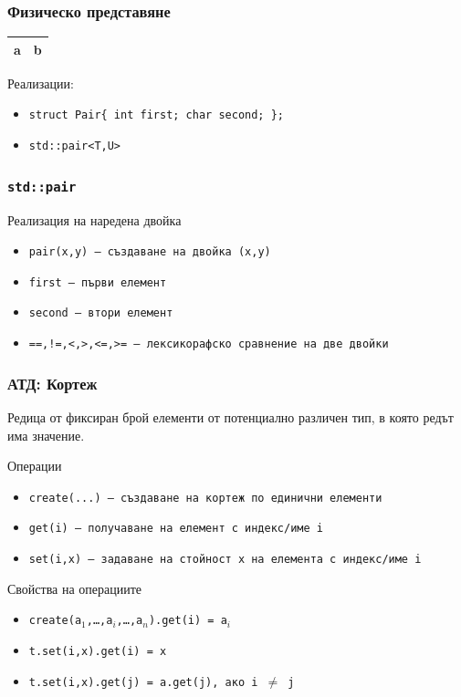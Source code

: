 \documentclass{beamer}
\begin{document}
\begin{frame}[fragile]
  \frametitle{Физическо представяне}

  \begin{center}
    \begin{tabular}{|m{5ex}|m{8ex}|}
      \hline
      \rowcolor{blue!60!green!40}
      a&b\\
      \hline
    \end{tabular}
  \end{center}
  \vspace{2em}

  Реализации:
  \begin{itemize}
  \item \verb#struct Pair{ int first; char second; };#
  \item \verb#std::pair<T,U>#
  \end{itemize}
\end{frame}

\begin{frame}
  \frametitle{\tt{std::pair}}

  Реализация на наредена двойка
  \begin{itemize}
  \item \tt{pair(x,y)} --- създаване на двойка (\tt x,\tt y)
  \item \tt{first} --- първи елемент
  \item \tt{second} --- втори елемент
  \item \tt{==,!=,<,>,<=,>=} --- лексикорафско сравнение на две двойки
  \end{itemize}
\end{frame}

\begin{frame}
  \frametitle{АТД: Кортеж}

  Редица от фиксиран брой елементи от потенциално различен тип, в която редът има значение.
  \vspace{0.5em}

  Операции
  \vspace{0.5em}

  \begin{itemize}
  \item \tt{create(...)} --- създаване на кортеж по единични елементи
  \item \tt{get(i)} --- получаване на елемент с индекс/име \tt i
  \item \tt{set(i,x)} --- задаване на стойност \tt x на елемента с индекс/име \tt i
  \end{itemize}

  Свойства на операциите
  \vspace{0.5em}

  \begin{itemize}
  \item \tt{create(a$_1$,\ldots,a$_i$,\ldots,a$_n$).get(i)} = \tt{a$_i$}
  \item \tt{t.set(i,x).get(i)} = \tt x
  \item \tt{t.set(i,x).get(j)} = \tt{a.get(j)}, ако \tt{i $\neq$ j}
  \end{itemize}
  
\end{frame}
\end{document}
